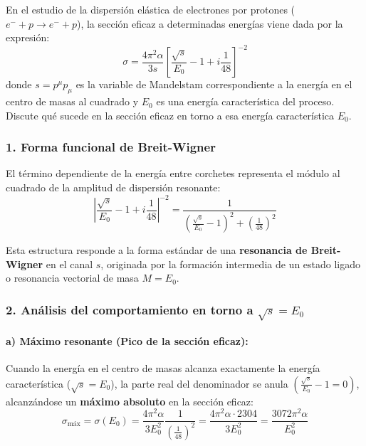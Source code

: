 \newpage
\begin{problema}
En el estudio de la dispersión elástica de electrones por protones ($e^- + p \rightarrow e^- + p$), la sección eficaz a determinadas energías viene dada por la expresión:
\begin{equation*}
\sigma = \frac{4\pi^{2}\alpha}{3s} \left[ \frac{\sqrt{s}}{E_{0}} - 1 + i \frac{1}{48} \right]^{-2}
\end{equation*}
donde $s = p^{\mu}p_{\mu}$ es la variable de Mandelstam correspondiente a la energía en el centro de masas al cuadrado y $E_{0}$ es una energía característica del proceso. Discute qué sucede en la sección eficaz en torno a esa energía característica $E_{0}$.

\tcblower

\subsubsection*{1. Forma funcional de Breit-Wigner}

El término dependiente de la energía entre corchetes representa el módulo al cuadrado de la amplitud de dispersión resonante:
\begin{equation*}
\left| \frac{\sqrt{s}}{E_0} - 1 + i \frac{1}{48} \right|^{-2} = \frac{1}{\left( \frac{\sqrt{s}}{E_0} - 1 \right)^2 + \left( \frac{1}{48} \right)^2}
\end{equation*}

Esta estructura responde a la forma estándar de una \textbf{resonancia de Breit-Wigner} en el canal $s$, originada por la formación intermedia de un estado ligado o resonancia vectorial de masa $M = E_0$.

\subsubsection*{2. Análisis del comportamiento en torno a $\sqrt{s} = E_0$}

\paragraph{a) Máximo resonante (Pico de la sección eficaz):}
Cuando la energía en el centro de masas alcanza exactamente la energía característica ($\sqrt{s} = E_0$), la parte real del denominador se anula $\left(\frac{\sqrt{s}}{E_0} - 1 = 0\right)$, alcanzándose un \textbf{máximo absoluto} en la sección eficaz:
\begin{equation*}
\sigma_{\text{máx}} = \sigma(E_0) = \frac{4\pi^2 \alpha}{3 E_0^2} \frac{1}{\left(\frac{1}{48}\right)^2} = \frac{4\pi^2 \alpha \cdot 2304}{3 E_0^2} = \frac{3072 \pi^2 \alpha}{E_0^2}
\end{equation*}


\end{problema}
